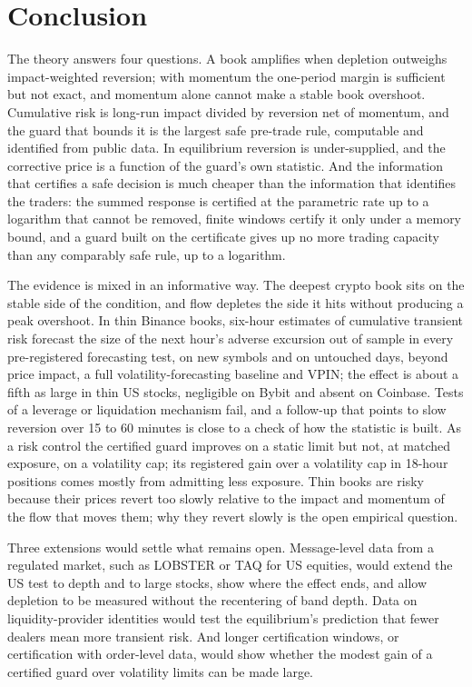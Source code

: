 \section{Conclusion}\label{sec:conclusion}

The theory answers four questions. A book amplifies when depletion outweighs impact-weighted reversion; with momentum the one-period margin is sufficient but not exact, and momentum alone cannot make a stable book overshoot. Cumulative risk is long-run impact divided by reversion net of momentum, and the guard that bounds it is the largest safe pre-trade rule, computable and identified from public data. In equilibrium reversion is under-supplied, and the corrective price is a function of the guard's own statistic. And the information that certifies a safe decision is much cheaper than the information that identifies the traders: the summed response is certified at the parametric rate up to a logarithm that cannot be removed, finite windows certify it only under a memory bound, and a guard built on the certificate gives up no more trading capacity than any comparably safe rule, up to a logarithm.

The evidence is mixed in an informative way. The deepest crypto book sits on the stable side of the condition, and flow depletes the side it hits without producing a peak overshoot. In thin Binance books, six-hour estimates of cumulative transient risk forecast the size of the next hour's adverse excursion out of sample in every pre-registered forecasting test, on new symbols and on untouched days, beyond price impact, a full volatility-forecasting baseline and VPIN; the effect is about a fifth as large in thin US stocks, negligible on Bybit and absent on Coinbase. Tests of a leverage or liquidation mechanism fail, and a follow-up that points to slow reversion over 15 to 60 minutes is close to a check of how the statistic is built. As a risk control the certified guard improves on a static limit but not, at matched exposure, on a volatility cap; its registered gain over a volatility cap in 18-hour positions comes mostly from admitting less exposure. Thin books are risky because their prices revert too slowly relative to the impact and momentum of the flow that moves them; why they revert slowly is the open empirical question.

Three extensions would settle what remains open. Message-level data from a regulated market, such as LOBSTER or TAQ for US equities, would extend the US test to depth and to large stocks, show where the effect ends, and allow depletion to be measured without the recentering of band depth. Data on liquidity-provider identities would test the equilibrium's prediction that fewer dealers mean more transient risk. And longer certification windows, or certification with order-level data, would show whether the modest gain of a certified guard over volatility limits can be made large.

